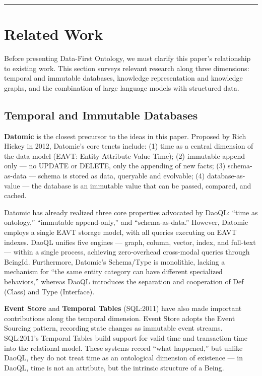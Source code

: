 \documentclass[11pt,a4paper]{article}
\begin{document}
\begin{center}\rule{0.5\linewidth}{0.5pt}\end{center}

\section{Related Work}\label{related-work}

Before presenting Data-First Ontology, we must clarify this paper's
relationship to existing work. This section surveys relevant research
along three dimensions: temporal and immutable databases, knowledge
representation and knowledge graphs, and the combination of large
language models with structured data.

\subsection{Temporal and Immutable
Databases}\label{temporal-and-immutable-databases}

\textbf{Datomic} \cite{hickey2012} is the closest precursor to the ideas in this
paper. Proposed by Rich Hickey in 2012, Datomic's core tenets include:
(1) time as a central dimension of the data model (EAVT:
Entity-Attribute-Value-Time); (2) immutable append-only --- no UPDATE or
DELETE, only the appending of new facts; (3) schema-as-data --- schema
is stored as data, queryable and evolvable; (4) database-as-value ---
the database is an immutable value that can be passed, compared, and
cached.

Datomic has already realized three core properties advocated by DaoQL:
``time as ontology,'' ``immutable append-only,'' and ``schema-as-data.''
However, Datomic employs a single EAVT storage model, with all queries
executing on EAVT indexes. DaoQL unifies five engines --- graph, column,
vector, index, and full-text --- within a single process, achieving
zero-overhead cross-modal queries through BeingId. Furthermore,
Datomic's Schema/Type is monolithic, lacking a mechanism for ``the same
entity category can have different specialized behaviors,'' whereas
DaoQL introduces the separation and cooperation of Def (Class) and Type
(Interface).

\textbf{Event Store} \cite{young2011} and \textbf{Temporal Tables} (SQL:2011)
\cite{kulkarni2012} have also made important contributions along the temporal
dimension. Event Store adopts the Event Sourcing pattern, recording
state changes as immutable event streams. SQL:2011's Temporal Tables
build support for valid time and transaction time into the relational
model. These systems record ``what happened,'' but unlike DaoQL, they do
not treat time as an ontological dimension of existence --- in DaoQL,
time is not an attribute, but the intrinsic structure of a Being.
\end{document}
